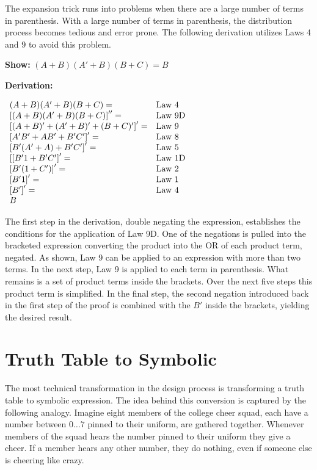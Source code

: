 The expansion trick runs into problems when there are a large
number of terms in parenthesis.  With a large number
of terms in parenthesis, the distribution process becomes tedious
and error prone. The following derivation utilizes Laws
4 and 9 to avoid this problem.

\textbf{Show:} $(A+B)(A'+B)(B+C) = B$

\textbf{Derivation:}

$\begin{array}[ht]{ll}
(A+B)(A'+B)(B+C) = 			& \text{Law 4} \\
\left[ (A+B)(A'+B)(B+C) \right] '' =& \text{Law 9D} \\
\left[ (A+B)'+(A'+B)'+(B+C)' \right]' = & \text{Law 9} \\
\left[ A'B'+AB'+B'C' \right]' = 	& \text{Law 8} \\
\left[ B'(A'+A)+B'C' \right]' = 	& \text{Law 5} \\
\left[ [B'1+ B'C' \right]' = 		& \text{Law 1D} \\
\left[ B'(1+C') \right]' = 		& \text{Law 2} \\
\left[ B'1 \right]' = 			& \text{Law 1} \\
\left[ B' \right]' = 			& \text{Law 4} \\
B  &  
\end{array}$

The first step in the derivation, double negating the expression, establishes 
the conditions for the application of Law 9D. One of the negations is
pulled into the bracketed expression converting the product into 
the OR of each product term, negated.  As shown, Law 9 can be applied
to an expression with more than two terms.  In the next step, Law 9 is 
applied to each term in parenthesis.  What remains is a set of product 
terms inside the brackets.  Over the next five steps this product term 
is simplified.  In the final step, the second negation introduced 
back in the first step of the proof is combined with the $B'$ 
inside the brackets, yielding the desired result.

\section{Truth Table to Symbolic}
\label{sec:representationsTTtoSymb}

The most technical transformation in the design process is transforming 
a truth table to symbolic expression.  The idea behind this conversion is 
captured by the following analogy.  Imagine eight members of the college 
cheer squad, each have a number between $0 \ldots 7$ pinned to their
uniform, are gathered together.  Whenever members of the squad hears
the number pinned to their uniform they give a cheer.  If a member hears
any other number, they do nothing, even if someone else is cheering like crazy.

